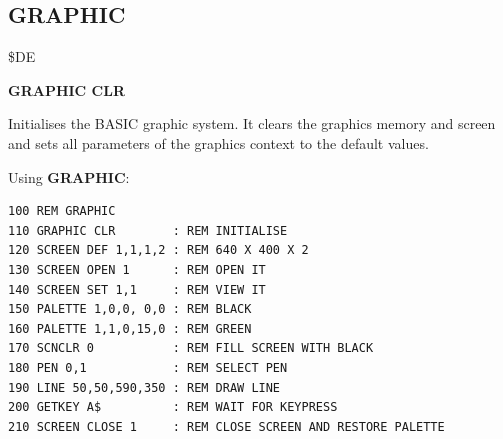 \subsection{GRAPHIC}
\begin{description}[leftmargin=2cm,style=nextline]
\item [Token:] \$DE
\item [Format:] {\bf GRAPHIC CLR}
\item [Usage:] Initialises the BASIC graphic system.
               It clears the graphics memory and screen and sets
               all parameters of the graphics context to the
               default values.

\item [Example:] Using {\bf GRAPHIC}:
\begin{tcolorbox}[colback=black,coltext=white]
\verbatimfont{\codefont}
\begin{verbatim}
100 REM GRAPHIC
110 GRAPHIC CLR        : REM INITIALISE
120 SCREEN DEF 1,1,1,2 : REM 640 X 400 X 2
130 SCREEN OPEN 1      : REM OPEN IT
140 SCREEN SET 1,1     : REM VIEW IT
150 PALETTE 1,0,0, 0,0 : REM BLACK
160 PALETTE 1,1,0,15,0 : REM GREEN
170 SCNCLR 0           : REM FILL SCREEN WITH BLACK
180 PEN 0,1            : REM SELECT PEN
190 LINE 50,50,590,350 : REM DRAW LINE
200 GETKEY A$          : REM WAIT FOR KEYPRESS
210 SCREEN CLOSE 1     : REM CLOSE SCREEN AND RESTORE PALETTE
\end{verbatim}
\end{tcolorbox}
\end{description}


\newpage
